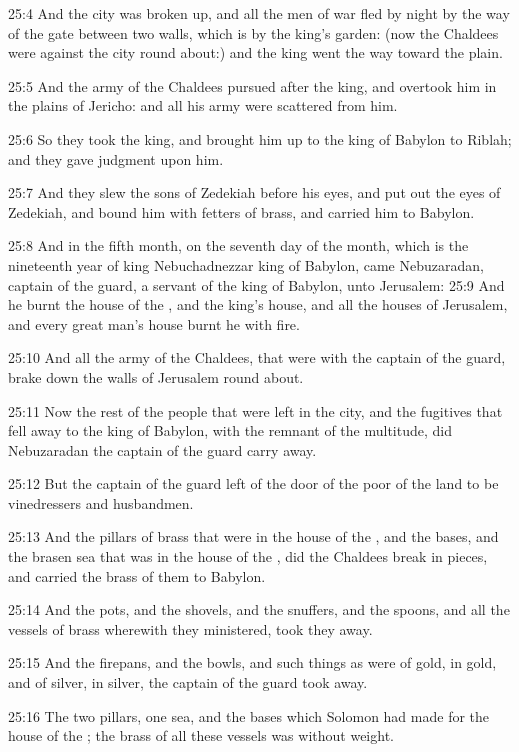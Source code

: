 25:4 And the city was broken up, and all the men of war fled by night by the way of the gate between two walls, which is by the king's garden: (now the Chaldees were against the city round about:) and the king went the way toward the plain.

25:5 And the army of the Chaldees pursued after the king, and overtook him in the plains of Jericho: and all his army were scattered from him.

25:6 So they took the king, and brought him up to the king of Babylon to Riblah; and they gave judgment upon him.

25:7 And they slew the sons of Zedekiah before his eyes, and put out the eyes of Zedekiah, and bound him with fetters of brass, and carried him to Babylon.

25:8 And in the fifth month, on the seventh day of the month, which is the nineteenth year of king Nebuchadnezzar king of Babylon, came Nebuzaradan, captain of the guard, a servant of the king of Babylon, unto Jerusalem: 25:9 And he burnt the house of the \LORD, and the king's house, and all the houses of Jerusalem, and every great man's house burnt he with fire.

25:10 And all the army of the Chaldees, that were with the captain of the guard, brake down the walls of Jerusalem round about.

25:11 Now the rest of the people that were left in the city, and the fugitives that fell away to the king of Babylon, with the remnant of the multitude, did Nebuzaradan the captain of the guard carry away.

25:12 But the captain of the guard left of the door of the poor of the land to be vinedressers and husbandmen.

25:13 And the pillars of brass that were in the house of the \LORD, and the bases, and the brasen sea that was in the house of the \LORD, did the Chaldees break in pieces, and carried the brass of them to Babylon.

25:14 And the pots, and the shovels, and the snuffers, and the spoons, and all the vessels of brass wherewith they ministered, took they away.

25:15 And the firepans, and the bowls, and such things as were of gold, in gold, and of silver, in silver, the captain of the guard took away.

25:16 The two pillars, one sea, and the bases which Solomon had made for the house of the \LORD; the brass of all these vessels was without weight.


